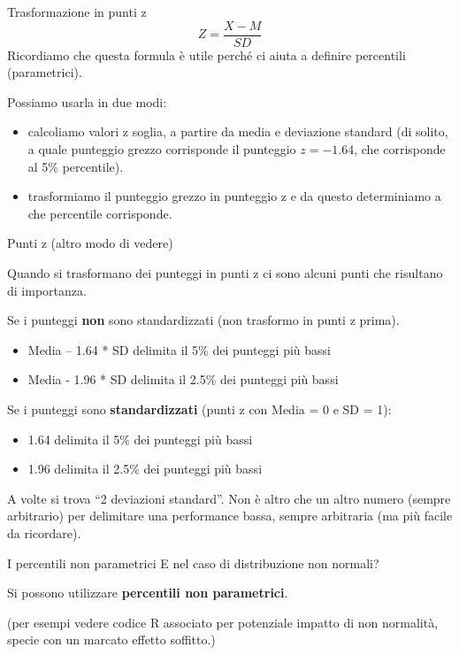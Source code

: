 \documentclass[
  ignorenonframetext,
  aspectratio=169,
]{beamer}
\providecommand{\tightlist}{%
  \setlength{\itemsep}{0pt}\setlength{\parskip}{0pt}}
\begin{document}
\begin{frame}{Trasformazione in punti z}
\label{trasformazione-in-punti-z}
\[
Z = \frac{X - M}{SD}
\] Ricordiamo che questa formula è utile perché ci aiuta a definire
percentili (parametrici).

Possiamo usarla in due modi:

\begin{itemize}
\item
  calcoliamo valori z soglia, a partire da media e deviazione standard
  (di solito, a quale punteggio grezzo corrisponde il punteggio
  \(z = -1.64\), che corrisponde al 5\% percentile).
\item
  trasformiamo il punteggio grezzo in punteggio z e da questo
  determiniamo a che percentile corrisponde.
\end{itemize}
\end{frame}

\begin{frame}{Punti z (altro modo di vedere)}
\label{punti-z-altro-modo-di-vedere}
\small

Quando si trasformano dei punteggi in punti z ci sono alcuni punti che
risultano di importanza.

Se i punteggi \textbf{non} sono standardizzati (non trasformo in punti z
prima).

\begin{itemize}
\tightlist
\item
  Media -- 1.64 * SD delimita il 5\% dei punteggi più bassi
\item
  Media - 1.96 * SD delimita il 2.5\% dei punteggi più bassi
\end{itemize}

Se i punteggi sono \textbf{standardizzati} (punti z con Media = 0 e SD =
1):

\begin{itemize}
\tightlist
\item
  1.64 delimita il 5\% dei punteggi più bassi
\item
  1.96 delimita il 2.5\% dei punteggi più bassi
\end{itemize}

A volte si trova ``2 deviazioni standard''. Non è altro che un altro
numero (sempre arbitrario) per delimitare una performance bassa, sempre
arbitraria (ma più facile da ricordare).
\end{frame}

\begin{frame}{I percentili non parametrici}
\label{i-percentili-non-parametrici}
E nel caso di distribuzione non normali?

Si possono utilizzare \textbf{percentili non parametrici}.

(per esempi vedere codice R associato per potenziale impatto di non
normalità, specie con un marcato effetto soffitto.)
\end{frame}
\end{document}
